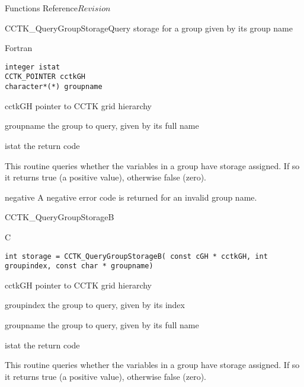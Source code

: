\begin{cactuspart}{ Functions Reference}{}{$Revision$}
\begin{FunctionDescription}{CCTK\_QueryGroupStorage}{Query storage for a group given by its group name}
\begin{SynopsisSection}
\begin{Synopsis}{Fortran}
\begin{verbatim}
integer istat
CCTK_POINTER cctkGH
character*(*) groupname\end{verbatim}
\end{Synopsis}
\end{SynopsisSection}
\begin{ParameterSection}
\begin{Parameter}{cctkGH}
pointer to CCTK grid hierarchy
\end{Parameter}
\begin{Parameter}{groupname}
the group to query, given by its full name
\end{Parameter}
\begin{Parameter}{istat}
the return code
\end{Parameter}
\end{ParameterSection}
\begin{Discussion}
This routine queries whether the variables in a group have storage assigned.
If so it returns true (a positive value), otherwise false (zero).
\end{Discussion}
\begin{ErrorSection}
\begin{Error}{negative}
A negative error code is returned for an invalid group name.
\end{Error}
\end{ErrorSection}
\end{FunctionDescription}


\begin{FunctionDescription}{CCTK\_QueryGroupStorageB}{}
\label{CCTK-QueryGroupStorageB}
\begin{SynopsisSection}
\begin{Synopsis}{C}
\begin{verbatim}int storage = CCTK_QueryGroupStorageB( const cGH * cctkGH, int groupindex, const char * groupname)\end{verbatim}
\end{Synopsis}
\end{SynopsisSection}
\begin{ParameterSection}
\begin{Parameter}{cctkGH}
pointer to CCTK grid hierarchy
\end{Parameter}
\begin{Parameter}{groupindex}
the group to query, given by its index
\end{Parameter}
\begin{Parameter}{groupname}
the group to query, given by its full name
\end{Parameter}
\begin{Parameter}{istat}
the return code
\end{Parameter}
\end{ParameterSection}
\begin{Discussion}
This routine queries whether the variables in a group have storage assigned.
If so it returns true (a positive value), otherwise false (zero).


\end{Discussion}
\end{FunctionDescription}
\end{cactuspart}
